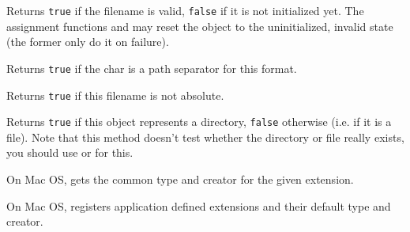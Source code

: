 \label{wxfilenameisok}


Returns {\tt true} if the filename is valid, {\tt false} if it is not
initialized yet. The assignment functions and
 may reset the object to the uninitialized,
invalid state (the former only do it on failure).


\label{wxfilenameispathseparator}


Returns {\tt true} if the char is a path separator for this format.


\label{wxfilenameisrelative}


Returns {\tt true} if this filename is not absolute.


\label{wxfilenameisdir}


Returns {\tt true} if this object represents a directory, {\tt false} otherwise
(i.e. if it is a file). Note that this method doesn't test whether the
directory or file really exists, you should use 
 or 
 for this.

\label{wxfilenamemacfinddefaulttypeandcreator}


On Mac OS, gets the common type and creator for the given extension.

\label{wxfilenamemacregisterdefaulttypeandcreator}


On Mac OS, registers application defined extensions and their default type and creator.

\label{wxfilenamemacsetdefaulttypeandcreator}

